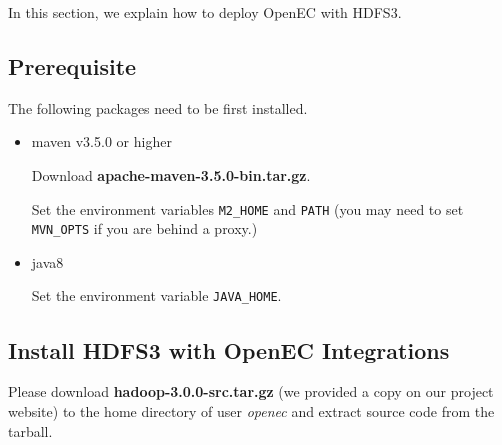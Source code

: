 \documentclass[letterpaper,12pt]{article}
\newcommand{\openec}{{\sf\small OpenEC}\xspace}
\begin{document}
In this section, we explain how to deploy \openec with HDFS3.

\subsection{Prerequisite}


The following packages need to be first installed.

\begin{itemize}


\item maven v3.5.0 or higher

Download {\bf apache-maven-3.5.0-bin.tar.gz}.

\begin{center}
\noindent{}
\end{center}

Set the environment variables {\tt M2\_HOME} and {\tt PATH} (you may need to
set {\tt MVN\_OPTS} if you are behind a proxy.)

\begin{center}
\noindent{}
\end{center}



\item java8

\begin{center}
\noindent{}
\end{center}

Set the environment variable {\tt JAVA\_HOME}.

\end{itemize}

\subsection{Install HDFS3 with OpenEC Integrations}
Please download {\bf hadoop-3.0.0-src.tar.gz} (we provided a copy on our project website)
to the home directory of user {\sl openec} and extract source code from the tarball.
\end{document}
